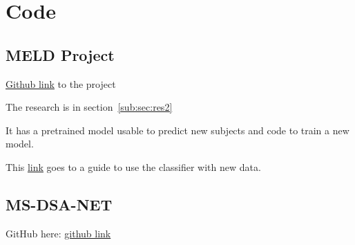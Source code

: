 \chapter{Code}

\section{MELD Project}
\label{sub:sec:meld_github}

\href{https://github.com/MELDProject/meld_classifier}{Github link} to the project

The research is in section~\ref{sub:sec:res2}

It has a pretrained model usable to predict new subjects and code to train a new model.

This \href{https://docs.google.com/document/d/1vF5U1i-B45OkE_8wdde8yHHypp6W9xNN_1DBoEGmn0E/edit?tab=t.0}{link} goes to a guide to use the classifier with new data.

\section{MS-DSA-NET}
\label{sec:code8}

GitHub here: \href{https://github.com/zhangxd0530/MS-DSA-NET}{github link}
